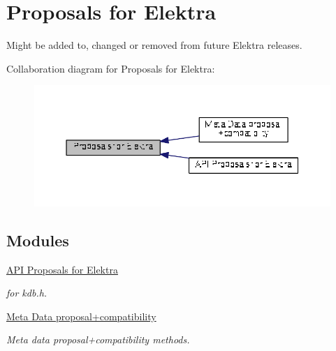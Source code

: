 \hypertarget{group__proposal}{\section{Proposals for Elektra}
\label{group__proposal}
}


Might be added to, changed or removed from future Elektra releases.  


Collaboration diagram for Proposals for Elektra\+:
\nopagebreak
\begin{figure}[H]
\begin{center}
\leavevmode
\includegraphics[width=350pt]{group__proposal}
\end{center}
\end{figure}
\subsection*{Modules}
\begin{DoxyCompactItemize}
\item 
\hyperlink{group__api}{A\+P\+I Proposals for Elektra}
\begin{DoxyCompactList}\small\item\em for kdb.\+h. \end{DoxyCompactList}\item 
\hyperlink{group__meta}{Meta Data proposal+compatibility}
\begin{DoxyCompactList}\small\item\em Meta data proposal+compatibility methods. \end{DoxyCompactList}\end{DoxyCompactItemize}
